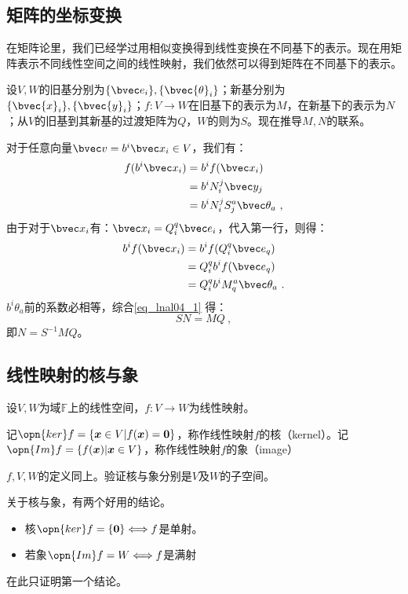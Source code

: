 \subsection{矩阵的坐标变换}
在矩阵论里，我们已经学过用相似变换得到线性变换在不同基下的表示。现在用矩阵表示不同线性空间之间的线性映射，我们依然可以得到矩阵在不同基下的表示。

设$V,W$的旧基分别为$\{\bvec e_i\},\{\bvec{\theta}_i\}$；新基分别为$\{\bvec{x}_i\},\{\bvec{y}_i\}$；$f:V\rightarrow W$在旧基下的表示为$M$，在新基下的表示为$N$；从$V$的旧基到其新基的过渡矩阵为$Q$，$W$的则为$S$。现在推导$M,N$的联系。

对于任意向量$\bvec v=b^i\bvec x_i\in V$，我们有：
\begin{equation}\label{eq_lnal04_1}
\begin{aligned}
f(b^i\bvec x_i)&=b^if(\bvec x_i)\\
&=b^iN^j_i\bvec y_j\\
&=b^iN^j_iS^a_j\bvec\theta_a~,
\end{aligned}
\end{equation}
由于对于$\bvec x_i$有：$\bvec x_i=Q_i^q\bvec e_i$，代入第一行，则得：
\begin{equation}
\begin{aligned}
b^if(\bvec x_i)&=b^if(Q_i^q\bvec e_q)\\
&=Q_i^qb^if(\bvec e_q)\\
&=Q_i^qb^iM^a_q\bvec \theta_a~.
\end{aligned}
\end{equation}
$b^i\theta_a$前的系数必相等，综合\autoref{eq_lnal04_1} 得：
\begin{equation}
SN=MQ~,
\end{equation}
即$N=S^{-1}MQ$。
\subsection{线性映射的核与象}

\begin{definition}{}
设$V,W$为域$\mathbb F$上的线性空间，$f:V\rightarrow W$为线性映射。

记$\opn{ker}f=\{\boldsymbol x\in V|f(\boldsymbol x)=\boldsymbol 0\}$，称作线性映射$f$的核（kernel）。记$\opn{Im}f=\{f(\boldsymbol x)|\boldsymbol x\in V\}$，称作线性映射$f$的象（image）
\end{definition}
\begin{exercise}{}
$f,V,W$的定义同上。验证核与象分别是$V$及$W$的子空间。
\end{exercise}
关于核与象，有两个好用的结论。
\begin{itemize}
\item 核$\opn{ker}f=\{\boldsymbol 0\}\Longleftrightarrow f$是单射。
\item 若象$\opn{Im}f=W\Longleftrightarrow f$是满射
\end{itemize}
在此只证明第一个结论。


